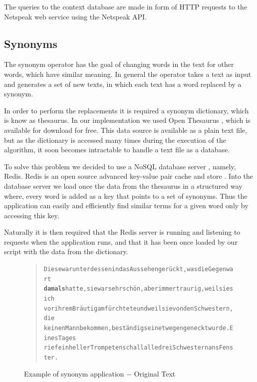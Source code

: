 \documentclass[11pt]{reportAlternative}
\begin{document}
The queries to the context database are made in form of HTTP requests to the Netspeak web service using the Netspeak API. \par

\subsection{Synonyms}
The synonym operator has the goal of changing words in the text for other words, which have similar meaning. In general the operator takes a text as input and generates a set of new texts, in which each text has a word replaced by a synonym.

In order to perform the replacements it is required a synonym dictionary, which is know as thesaurus. In our implementation we used Open Thesaurus \cite{OpenThesuarus}, which is available for download for free. This data source is available as a plain text file, but as the dictionary is accessed many times during the execution of the algorithm, it soon becomes intractable to handle a text file as a database.

To solve this problem we decided to use a NoSQL database server \cite{NoSQL}, namely, Redis. Redis is an open source advanced key-value pair cache and store \cite{Redis}. Into the database server we load once the data from the thesaurus in a structured way where, every word is added as a key that points to a set of synonyms. Thus the application can easily and efficiently find similar terms for a given word only by accessing this key.

Naturally it is then required that the Redis server is running and listening to requests when the application runs, and that it has been once loaded by our script with the data from the dictionary.

\begin{figure}[H]
\begin{quote}
\begin{alltt}
Diese war unterdessen in das Aussehen gerückt, was die Gegenwart
\textbf{damals} hatte, sie war sehr schön, aber immer traurig, weil sie sich
vor ihrem Bräutigam fürchtete und weil sie von den Schwestern, die
keinen Mann bekommen, beständig seinetwegen geneckt wurde. Eines Tages
rief ein heller Trompetenschall alle drei Schwestern ans Fenster.
\end{alltt}
\end{quote}
\caption{Example of synonym application $-$ Original Text}
\end{figure}
\end{document}
